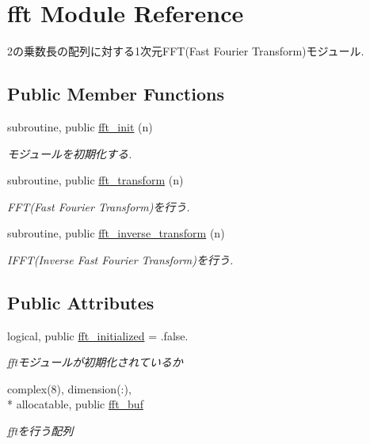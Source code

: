 \hypertarget{classfft}{\section{fft Module Reference}
\label{classfft}
}


2の乗数長の配列に対する1次元\-F\-F\-T(Fast Fourier Transform)モジュール.  


\subsection*{Public Member Functions}
\begin{DoxyCompactItemize}
\item 
subroutine, public \hyperlink{classfft_af00aacbe640c67770b5ea1357f0b6454}{fft\-\_\-init} (n)
\begin{DoxyCompactList}\small\item\em モジュールを初期化する. \end{DoxyCompactList}\item 
subroutine, public \hyperlink{classfft_abb101a3d422465ed3a74bc84eb5c4a82}{fft\-\_\-transform} (n)
\begin{DoxyCompactList}\small\item\em F\-F\-T(\-Fast Fourier Transform)を行う. \end{DoxyCompactList}\item 
subroutine, public \hyperlink{classfft_af99727e7e01fc39c26ddbba6b31b79b9}{fft\-\_\-inverse\-\_\-transform} (n)
\begin{DoxyCompactList}\small\item\em I\-F\-F\-T(\-Inverse Fast Fourier Transform)を行う. \end{DoxyCompactList}\end{DoxyCompactItemize}
\subsection*{Public Attributes}
\begin{DoxyCompactItemize}
\item 
\hypertarget{classfft_abec5415ac95142f19f0fef21485e5394}{logical, public \hyperlink{classfft_abec5415ac95142f19f0fef21485e5394}{fft\-\_\-initialized} = .false.}\label{classfft_abec5415ac95142f19f0fef21485e5394}

\begin{DoxyCompactList}\small\item\em fftモジュールが初期化されているか \end{DoxyCompactList}\item 
\hypertarget{classfft_af8e11378337dd718e26573d62135878b}{complex(8), dimension(\-:), \\*
allocatable, public \hyperlink{classfft_af8e11378337dd718e26573d62135878b}{fft\-\_\-buf}}\label{classfft_af8e11378337dd718e26573d62135878b}

\begin{DoxyCompactList}\small\item\em fftを行う配列 \end{DoxyCompactList}\end{DoxyCompactItemize}


